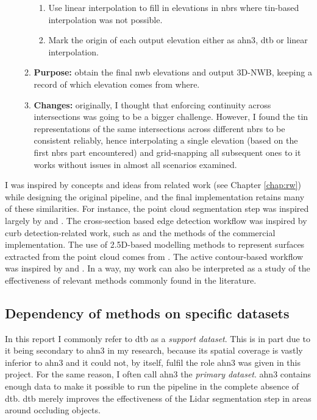 \begin{enumerate}
\begin{enumerate}
\begin{enumerate}
            \item Use linear interpolation to fill in elevations in \ac{nbrs} where \ac{tin}-based interpolation was not possible.
            \item Mark the origin of each output elevation either as \ac{ahn3}, \ac{dtb} or linear interpolation.
        \end{enumerate}
        \item \textbf{Purpose:} obtain the final \ac{nwb} elevations and output 3D-NWB, keeping a record of which elevation comes from where.
        \item \textbf{Changes:} originally, I thought that enforcing continuity across intersections was going to be a bigger challenge. However, I found the \ac{tin} representations of the same intersections across different \ac{nbrs} to be consistent reliably, hence interpolating a single elevation (based on the first \ac{nbrs} part encountered) and grid-snapping all subsequent ones to it works without issues in almost all scenarios examined.
    \end{enumerate}
\end{enumerate}

I was inspired by concepts and ideas from related work (see Chapter \ref{chap:rw}) while designing the original pipeline, and the final implementation retains many of these similarities. For instance, the point cloud segmentation step was inspired largely by \cite{oudeElberink_vosselman_2009} and \cite{boyko_funkhauser_2011}. The cross-section based edge detection workflow was inspired by curb detection-related work, such as \cite{yang_etal_2013} and the methods of the commercial implementation. The use of 2.5D-based modelling methods to represent surfaces extracted from the point cloud comes from \cite{oudeElberink_vosselman_2006}. The active contour-based workflow was inspired by \cite{boyko_funkhauser_2011} and \cite{gopfert_etal_2011}. In a way, my work can also be interpreted as a study of the effectiveness of relevant methods commonly found in the literature.

\subsection{Dependency of methods on specific datasets}
\label{sub:m_generalisation}

In this report I commonly refer to \ac{dtb} as a \textit{support dataset}. This is in part due to it being secondary to \ac{ahn3} in my research, because its spatial coverage is vastly inferior to \ac{ahn3} and it could not, by itself, fulfil the role \ac{ahn3} was given in this project. For the same reason, I often call \ac{ahn3} the \textit{primary dataset}. \ac{ahn3} contains enough data to make it possible to run the pipeline in the complete absence of \ac{dtb}. \ac{dtb} merely improves the effectiveness of the Lidar segmentation step in areas around occluding objects.

